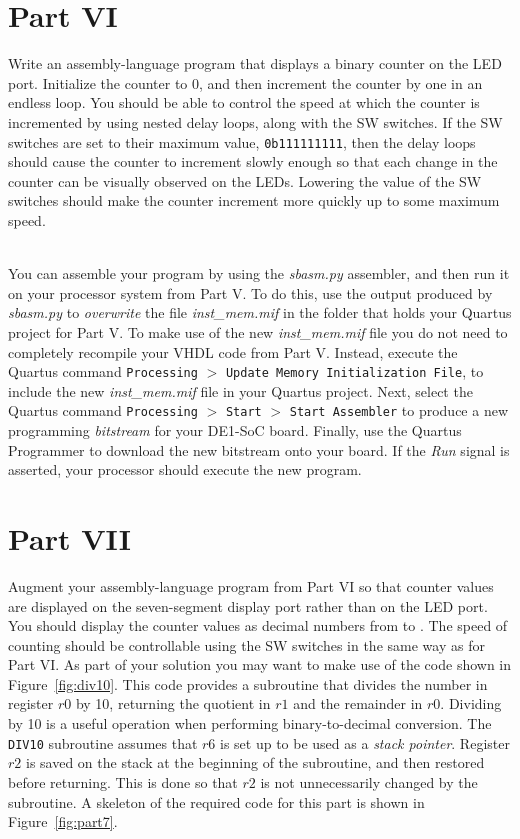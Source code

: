 \documentclass[epsfig,10pt,fullpage]{article}
\begin{document}
\section*{Part VI}
Write an assembly-language program that displays a binary counter on the LED port. Initialize 
the counter to 0, and then increment the counter by one in an endless loop. You should be
able to control the speed at which the counter is incremented by using nested delay loops, 
along with the SW switches. If the SW switches are set to their maximum value, 
\texttt{0b111111111}, then the delay loops should cause the counter to increment slowly enough 
so that each change in the counter can be visually observed on the LEDs. Lowering the value 
of the SW switches should make the counter increment more quickly up to some maximum speed. 

~\\
\noindent
You can assemble your program by using the {\it sbasm.py} assembler, and then run it on
your processor system from Part V. To do this, use the output produced by {\it sbasm.py} to 
{\it overwrite} the file {\it inst\_mem.mif} in the folder that holds your Quartus project for
Part V. To make use of the new {\it inst\_mem.mif} file you do not need to completely 
recompile your VHDL code from Part V. Instead, execute the Quartus command 
\texttt{Processing} $>$ \texttt{Update Memory Initialization File}, to include the 
new {\it inst\_mem.mif} file in your Quartus project. Next, select the Quartus 
command \texttt{Processing} $>$ \texttt{Start} $>$ \texttt{Start Assembler} to produce a new 
programming {\it bitstream} for your DE1-SoC board. Finally, use the Quartus Programmer to 
download the new bitstream onto your board. If the {\it Run} signal is asserted, your
processor should execute the new program.

\section*{Part VII}
Augment your assembly-language program from Part VI so that counter values are displayed
on the seven-segment display port rather than on the LED port. You should display the
counter values as decimal numbers from \texttt{} to \texttt{}.
The speed of counting should be controllable using the SW switches in the same way as for
Part VI. As part of your solution you may want to make use of the code shown in 
Figure~\ref{fig:div10}. This code provides a subroutine that divides the number in
register $r0$ by 10, returning the quotient in $r1$ and the remainder in $r0$. Dividing by 10 is a 
useful operation when performing binary-to-decimal conversion. The \texttt{DIV10} subroutine
assumes that $r6$ is set up to be used as a {\it stack pointer}. Register $r2$ is saved on the
stack at the beginning of the subroutine, and then restored before returning. This is done so
that $r2$ is not unnecessarily changed by the subroutine. A skeleton of the required code
for this part is shown in Figure~\ref{fig:part7}.
\end{document}
